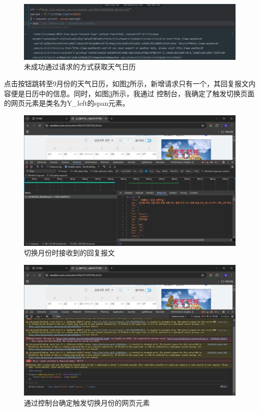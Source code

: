 \begin{figure}[!htbp]
    \centering
    \includegraphics[width=\textwidth]{figures/fail.png}
    \caption{未成功通过请求的方式获取天气日历}\label{fail}
\end{figure}

点击按钮跳转至9月份的天气日历，如图\ref{newcalendarresponse}所示，新增请求只有一个，其回复报文内容便是日历中的信息。同时，如图\ref{locateaction}所示，我通过
控制台，我确定了触发切换页面的网页元素是类名为Y\_left的span元素。

\begin{figure}[!htbp]
    \centering
    \includegraphics[width=\textwidth]{figures/new_calendar_response.png}
    \caption{切换月份时接收到的回复报文}\label{newcalendarresponse}
\end{figure}

\begin{figure}[!htbp]
    \centering
    \includegraphics[width=\textwidth]{figures/locate_action.png}
    \caption{通过控制台确定触发切换月份的网页元素}\label{locateaction}
\end{figure}

